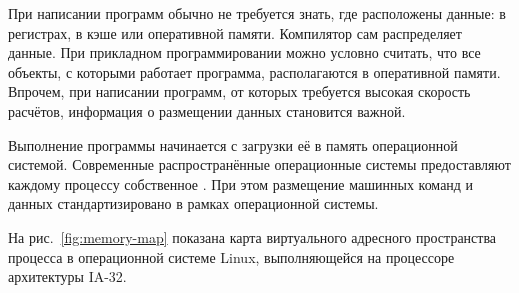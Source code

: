 При написании программ обычно не требуется знать, где расположены
данные: в регистрах, в кэше или оперативной памяти. Компилятор сам
распределяет данные. При прикладном программировании можно условно
считать, что все объекты, с которыми работает программа, располагаются
в оперативной памяти. Впрочем, при написании программ, от которых
требуется высокая скорость расчётов, информация о размещении данных
становится важной.


Выполнение программы начинается с загрузки её в память операционной
системой. Современные распространённые операционные системы
предоставляют каждому процессу собственное
. При этом
размещение машинных команд и данных стандартизировано в рамках
операционной системы.

На рис.~\ref{fig:memory-map} показана карта виртуального адресного
пространства процесса в операционной системе Linux, выполняющейся на
процессоре архитектуры IA-32.

